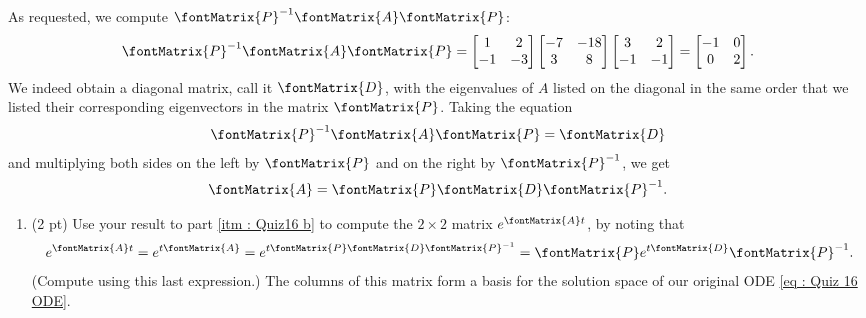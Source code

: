 {As requested, we compute $\fontMatrix{P}^{-1} \fontMatrix{A} \fontMatrix{P}$:
\begin{align*}
\fontMatrix{P}^{-1} \fontMatrix{A} \fontMatrix{P}
=
\begin{bmatrix}
1	&	2	\\
-1	&	-3
\end{bmatrix}%
\begin{bmatrix}
-7	&	-18	\\
3	&	8
\end{bmatrix}%
\begin{bmatrix}
3	&	2	\\
-1	&	-1
\end{bmatrix}%
=
\begin{bmatrix}
-1	&	0	\\
0	&	2
\end{bmatrix}%
.
\end{align*}
We indeed obtain a diagonal matrix, call it $\fontMatrix{D}$, with the eigenvalues of $A$ listed on the diagonal in the same order that we listed their corresponding eigenvectors in the matrix $\fontMatrix{P}$. Taking the equation
\begin{align*}
\fontMatrix{P}^{-1} \fontMatrix{A} \fontMatrix{P}
=
\fontMatrix{D}
\end{align*}
and multiplying both sides on the left by $\fontMatrix{P}$ and on the right by $\fontMatrix{P}^{-1}$, we get
\begin{align*}
\fontMatrix{A}
=
\fontMatrix{P} \fontMatrix{D} \fontMatrix{P}^{-1}.
\end{align*}}%




\begin{enumerate}[resume,label=(\alph*)]
\item\label{itm : Quiz16 c} (2 pt) Use your result to part \ref{itm : Quiz16 b} to compute the $2 \times 2$ matrix $e^{\fontMatrix{A} t}$, by noting that
\begin{align*}
e^{\fontMatrix{A} t}
=
e^{t \fontMatrix{A}}
=
e^{t \fontMatrix{P} \fontMatrix{D} \fontMatrix{P}^{-1}}
=
\fontMatrix{P} e^{t \fontMatrix{D}} \fontMatrix{P}^{-1}.
\end{align*}
(Compute using this last expression.) The columns of this matrix form a basis for the solution space of our original ODE \eqref{eq : Quiz 16 ODE}.
\end{enumerate}

